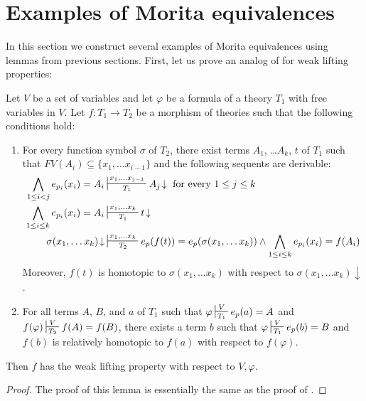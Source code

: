 \documentclass[reqno]{amsart}
\theoremstyle{definition}
\theoremstyle{remark}
\numberwithin{figure}{section}
\begin{document}


\section{Examples of Morita equivalences}

In this section we construct several examples of Morita equivalences using lemmas from previous sections.
First, let us prove an analog of  for weak lifting properties:

\begin{lem}[eq-char-eq]
Let $V$ be a set of variables and let $\varphi$ be a formula of a theory $T_1$ with free variables in $V$.
Let $f : T_1 \to T_2$ be a morphism of theories such that the following conditions hold:
\begin{enumerate}
\item \label{it:char-fun-eq} For every function symbol $\sigma$ of $T_2$, there exist terms $A_1$, \ldots $A_k$, $t$ of $T_1$ such that $FV(A_i) \subseteq \{ x_1, \ldots x_{i-1} \}$ and the following sequents are derivable:
\begin{align*}
\bigwedge_{1 \leq i < j} e_{p_i}(x_i) = A_i & \sststile{T_1}{x_1, \ldots x_{j-1}} A_j\!\downarrow \text{ for every } 1 \leq j \leq k \\
\bigwedge_{1 \leq i \leq k} e_{p_i}(x_i) = A_i & \sststile{T_1}{x_1, \ldots x_k} t\!\downarrow \\
\sigma(x_1, \ldots x_k)\!\downarrow & \sststile{T_2}{x_1, \ldots x_k} e_p(f(t)) = e_p(\sigma(x_1, \ldots x_k)) \land \bigwedge_{1 \leq i \leq k} e_{p_i}(x_i) = f(A_i)
\end{align*}
Moreover, $f(t)$ is homotopic to $\sigma(x_1, \ldots x_k)$ with respect to $\sigma(x_1, \ldots x_k)\!\downarrow$.
\item \label{it:char-type-eq} For all terms $A$, $B$, and $a$ of $T_1$ such that $\varphi \sststile{T_1}{V} e_p(a) = A$ and $f(\varphi) \sststile{T_2}{V} f(A) = f(B)$,
there exists a term $b$ such that $\varphi \sststile{T_1}{V} e_p(b) = B$ and $f(b)$ is relatively homotopic to $f(a)$ with respect to $f(\varphi)$.
\end{enumerate}
Then $f$ has the weak lifting property with respect to $V,\varphi$.
\end{lem}
\begin{proof}
The proof of this lemma is essentially the same as the proof of .
\end{proof}
\end{document}
